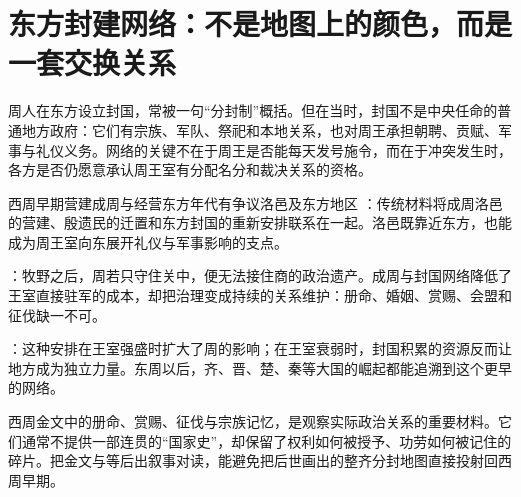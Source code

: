 \section{东方封建网络：不是地图上的颜色，而是一套交换关系}

周人在东方设立封国，常被一句“分封制”概括。但在当时，封国不是中央任命的普通地方政府：它们有宗族、军队、祭祀和本地关系，也对周王承担朝聘、贡赋、军事与礼仪义务。网络的关键不在于周王是否能每天发号施令，而在于冲突发生时，各方是否仍愿意承认周王室有分配名分和裁决关系的资格。

\begin{event}{西周早期}{营建成周与经营东方}{年代有争议}{洛邑及东方地区}
：传统材料将成周洛邑的营建、殷遗民的迁置和东方封国的重新安排联系在一起。洛邑既靠近东方，也能成为周王室向东展开礼仪与军事影响的支点。

：牧野之后，周若只守住关中，便无法接住商的政治遗产。成周与封国网络降低了王室直接驻军的成本，却把治理变成持续的关系维护：册命、婚姻、赏赐、会盟和征伐缺一不可。

：这种安排在王室强盛时扩大了周的影响；在王室衰弱时，封国积累的资源反而让地方成为独立力量。东周以后，齐、晋、楚、秦等大国的崛起都能追溯到这个更早的网络。
\end{event}

\begin{sourcenote}[金文比后出的整齐故事更接近什么]
西周金文中的册命、赏赐、征伐与宗族记忆，是观察实际政治关系的重要材料。它们通常不提供一部连贯的“国家史”，却保留了权利如何被授予、功劳如何被记住的碎片。把金文与等后出叙事对读，能避免把后世画出的整齐分封地图直接投射回西周早期。
\end{sourcenote}
